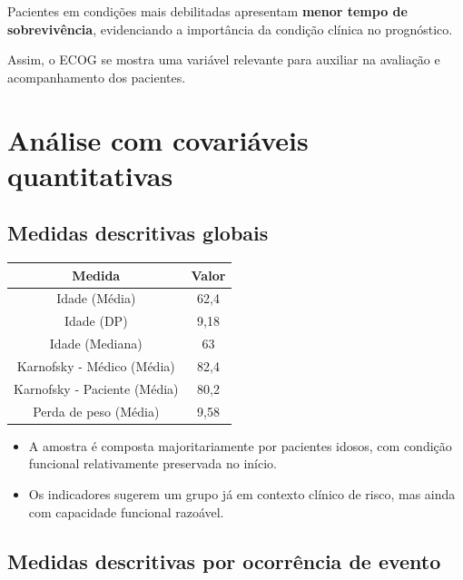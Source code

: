 \documentclass[
  brazilian,
  letterpaper,
  DIV=11,
  numbers=noendperiod]{scrartcl}
\newcounter{none} %
\begin{document}
Pacientes em condições mais debilitadas apresentam \textbf{menor tempo
de sobrevivência}, evidenciando a importância da condição clínica no
prognóstico.

Assim, o ECOG se mostra uma variável relevante para auxiliar na
avaliação e acompanhamento dos pacientes.

\section{\texorpdfstring{\textbf{Análise com covariáveis
quantitativas}}{Análise com covariáveis quantitativas}}\label{anuxe1lise-com-covariuxe1veis-quantitativas}

\subsection{\texorpdfstring{\textbf{Medidas descritivas
globais}}{Medidas descritivas globais}}\label{medidas-descritivas-globais}

{\def\LTcaptype{none} %
\begin{longtable}[]{@{}cc@{}}
\toprule\noalign{}
Medida & Valor \\
\midrule\noalign{}
\endhead
\bottomrule\noalign{}
\endlastfoot
Idade (Média) & 62,4 \\
Idade (DP) & 9,18 \\
Idade (Mediana) & 63 \\
Karnofsky - Médico (Média) & 82,4 \\
Karnofsky - Paciente (Média) & 80,2 \\
Perda de peso (Média) & 9,58 \\
\end{longtable}
}

\begin{itemize}
\item
  A amostra é composta majoritariamente por pacientes idosos, com
  condição funcional relativamente preservada no início.
\item
  Os indicadores sugerem um grupo já em contexto clínico de risco, mas
  ainda com capacidade funcional razoável.
\end{itemize}

\subsection{\texorpdfstring{\textbf{Medidas descritivas por ocorrência
de
evento}}{Medidas descritivas por ocorrência de evento}}\label{medidas-descritivas-por-ocorruxeancia-de-evento}
\end{document}
